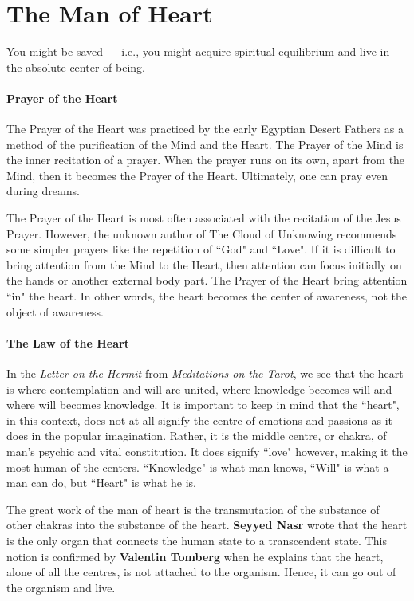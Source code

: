 \section{The Man of Heart}

\begin{quotex}
You might be saved — i.e., you might acquire spiritual equilibrium and live in the absolute center of being. 

\end{quotex}
\paragraph{Prayer of the Heart}
The Prayer of the Heart was practiced by the early Egyptian Desert Fathers as a method of the purification of the Mind and the Heart. The Prayer of the Mind is the inner recitation of a prayer. When the prayer runs on its own, apart from the Mind, then it becomes the Prayer of the Heart. Ultimately, one can pray even during dreams.

The Prayer of the Heart is most often associated with the recitation of the Jesus Prayer. However, the unknown author of The Cloud of Unknowing recommends some simpler prayers like the repetition of ``God" and ``Love". If it is difficult to bring attention from the Mind to the Heart, then attention can focus initially on the hands or another external body part. The Prayer of the Heart bring attention ``in" the heart. In other words, the heart becomes the center of awareness, not the object of awareness.

\paragraph{The Law of the Heart}
In the \emph{Letter on the Hermit} from \textit{Meditations on the Tarot}, we see that the heart is where contemplation and will are united, where knowledge becomes will and where will becomes knowledge. It is important to keep in mind that the ``heart", in this context, does not at all signify the centre of emotions and passions as it does in the popular imagination. Rather, it is the middle centre, or chakra, of man's psychic and vital constitution. It does signify ``love" however, making it the most human of the centers. ``Knowledge" is what man knows, ``Will" is what a man can do, but ``Heart" is what he is.

The great work of the man of heart is the transmutation of the substance of other chakras into the substance of the heart. \textbf{Seyyed Nasr} wrote that the heart is the only organ that connects the human state to a transcendent state. This notion is confirmed by \textbf{Valentin Tomberg} when he explains that the heart, alone of all the centres, is not attached to the organism. Hence, it can go out of the organism and live.

